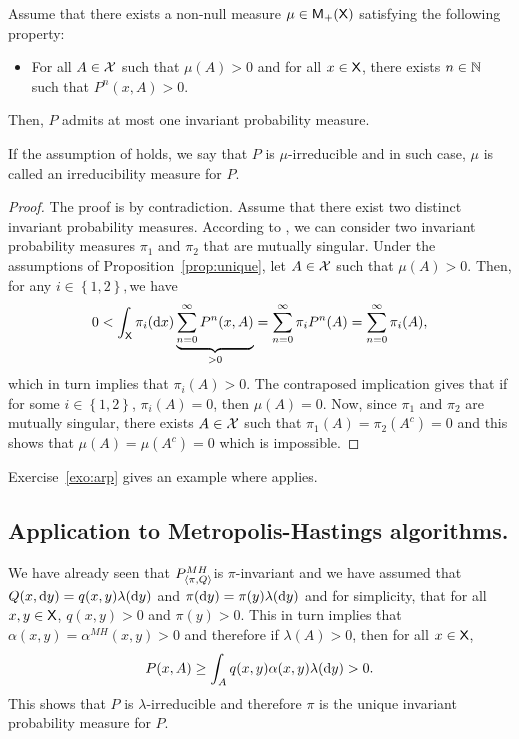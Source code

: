 \documentclass[english,graybox,envcountchap,envcountsame,sectrefs,shortlabels]{svmono}
\theoremstyle{style}
\begin{document}
\begin{proposition}
\label{prop:unique}Assume that there exists a non-null measure \textup{$\mu\in\mathsf{M}_{+}(\mathsf{X})$}
satisfying the following property:
\begin{itemize}
\item For all $A\in\mathcal{X}$ such that $\mu(A)>0$ and for all $x\in\mathsf{X}$,
there exists $n\in\mathbb{N}$ such that $P^{n}(x,A)>0$.
\end{itemize}
Then, $P$ admits at most one invariant probability measure.
\end{proposition}If the assumption of  holds, we say that $P$
is $\mu$-irreducible  and in such case, $\mu$ is called
an irreducibility measure for $P$.
\begin{proof}
The proof is by contradiction. Assume that there exist two distinct
invariant probability measures. According to ,
we can consider two invariant probability measures $\pi_{1}$ and
$\pi_{2}$ that are mutually singular. Under the assumptions of 
Proposition~\ref{prop:unique}, let $A\in\mathcal{X}$ such that $\mu(A)>0$. Then, for any
$i\in\left\{ 1,2\right\} ,$we have
\[
0<\int_{\mathsf{X}}\pi_{i}(\mathrm{d} x)\underbrace{\sum_{n=0}^{\infty}P^{n}(x,A)}_{>0}=\sum_{n=0}^{\infty}\pi_{i}P^{n}(A)=\sum_{n=0}^{\infty}\pi_{i}(A),
\]
which in turn implies that $\pi_{i}(A)>0$. The contraposed implication
gives that if for some $i\in\left\{ 1,2\right\} $, $\pi_{i}(A)=0$,
then $\mu(A)=0$. Now, since $\pi_1$ and $\pi_2$ 
are mutually singular, there exists $A\in\mathcal{X}$ such that $\pi_{1}(A)=\pi_{2}(A^{c})=0$
and this shows that $\mu(A)=\mu(A^{c})=0$ which is impossible.
\end{proof}

Exercise~\ref{exo:arp} gives an example where  applies.
\subsection{\label{subsec:MH:uniq}Application to Metropolis-Hastings algorithms. }

We have already seen that $P_{\langle\pi,Q\rangle}^{MH}$is $\pi$-invariant and we
have assumed that $Q(x,\mathrm{d} y)=q(x,y)\lambda(\mathrm{d} y)$ and $\pi(\mathrm{d} y)=\pi(y)\lambda(\mathrm{d} y)$
and for simplicity, that for all $x,y\in\mathsf{X}$, $q(x,y)>0$
and $\pi(y)>0$. This in turn implies that $\alpha(x,y)=\alpha^{MH}(x,y)>0$
and therefore if $\lambda(A)>0$, then for all $x\in\mathsf{X}$,
\[
P(x,A)\geq\int_{A}q(x,y)\alpha(x,y)\lambda(\mathrm{d} y)>0.
\]
This shows that $P$ is $\lambda$-irreducible and therefore $\pi$
is the unique invariant probability measure for $P$.
\end{document}
